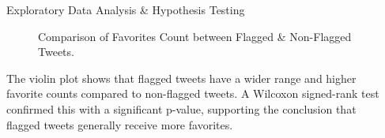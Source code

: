 \documentclass[final]{beamer}
\newlength{\sepwidth}
\newlength{\colwidth}
\newcommand{\separatorcolumn}{\begin{column}{\sepwidth}\end{column}}
\begin{document}
\begin{frame}[t]
\begin{columns}[t]
\begin{column}{\colwidth}
\begin{block}{Exploratory Data Analysis \& Hypothesis Testing}
\begin{itemize}
\begin{figure}
                        \caption{Comparison of Favorites Count between Flagged \& Non-Flagged Tweets.}
                    \end{figure}
        \end{itemize}
        The violin plot shows that flagged tweets have a wider range and higher favorite counts compared to non-flagged tweets. A Wilcoxon signed-rank test confirmed this with a significant p-value, supporting the conclusion that flagged tweets generally receive more favorites.

    \begin{itemize}
    \begin{large}
    \end{large}
  \end{itemize}

        
\end{block}

\end{column}

\separatorcolumn


\end{columns}
\end{frame}
\end{document}
